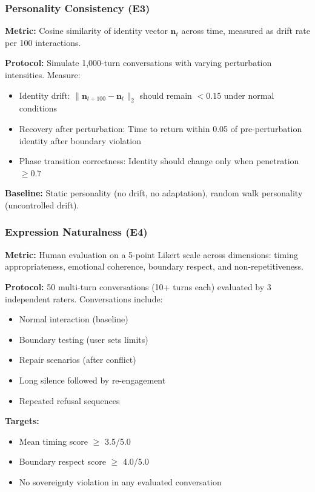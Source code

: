 \documentclass[10pt,twocolumn]{article}
\begin{document}
\subsubsection{Personality Consistency (E3)}

\textbf{Metric:} Cosine similarity of identity vector $\mathbf{n}_t$ across time, measured as drift rate per 100 interactions.

\textbf{Protocol:} Simulate 1,000-turn conversations with varying perturbation intensities. Measure:
\begin{itemize}[nosep,leftmargin=*]
\item Identity drift: $\|\mathbf{n}_{t+100} - \mathbf{n}_t\|_2$ should remain $< 0.15$ under normal conditions
\item Recovery after perturbation: Time to return within 0.05 of pre-perturbation identity after boundary violation
\item Phase transition correctness: Identity should change only when penetration $\geq 0.7$
\end{itemize}

\textbf{Baseline:} Static personality (no drift, no adaptation), random walk personality (uncontrolled drift).

\subsubsection{Expression Naturalness (E4)}

\textbf{Metric:} Human evaluation on a 5-point Likert scale across dimensions: timing appropriateness, emotional coherence, boundary respect, and non-repetitiveness.

\textbf{Protocol:} 50 multi-turn conversations (10+ turns each) evaluated by 3 independent raters. Conversations include:
\begin{itemize}[nosep,leftmargin=*]
\item Normal interaction (baseline)
\item Boundary testing (user sets limits)
\item Repair scenarios (after conflict)
\item Long silence followed by re-engagement
\item Repeated refusal sequences
\end{itemize}

\textbf{Targets:}
\begin{itemize}[nosep,leftmargin=*]
\item Mean timing score $\geq$ 3.5/5.0
\item Boundary respect score $\geq$ 4.0/5.0
\item No sovereignty violation in any evaluated conversation
\end{itemize}
\end{document}
